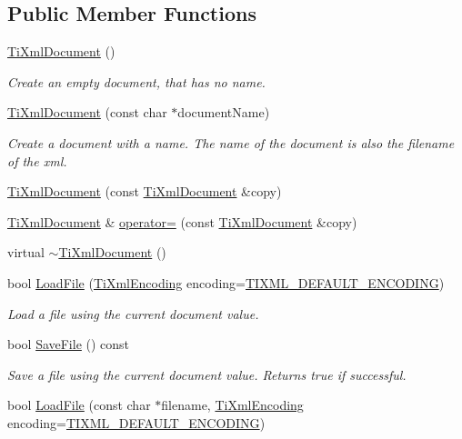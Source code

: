 \subsection*{Public Member Functions}
\begin{DoxyCompactItemize}
\item 
\hyperlink{class_ti_xml_document_a9f5e84335708fde98400230f9f12659c}{TiXmlDocument} ()
\begin{DoxyCompactList}\small\item\em Create an empty document, that has no name. \end{DoxyCompactList}\item 
\hyperlink{class_ti_xml_document_ae4508b452d0c3061db085f3db27b8396}{TiXmlDocument} (const char $\ast$documentName)
\begin{DoxyCompactList}\small\item\em Create a document with a name. The name of the document is also the filename of the xml. \end{DoxyCompactList}\item 
\hyperlink{class_ti_xml_document_a323a7486e7da6099cdc19a5ff7e74b07}{TiXmlDocument} (const \hyperlink{class_ti_xml_document}{TiXmlDocument} \&copy)
\item 
\hyperlink{class_ti_xml_document}{TiXmlDocument} \& \hyperlink{class_ti_xml_document_aa56fd4dbe8917d2033d865909e2d737e}{operator=} (const \hyperlink{class_ti_xml_document}{TiXmlDocument} \&copy)
\item 
virtual \hyperlink{class_ti_xml_document_a1b8a035c2c2aab38e4387246a0b712c5}{$\sim$TiXmlDocument} ()
\item 
bool \hyperlink{class_ti_xml_document_a4c852a889c02cf251117fd1d9fe1845f}{LoadFile} (\hyperlink{tinyxml_8h_a88d51847a13ee0f4b4d320d03d2c4d96}{TiXmlEncoding} encoding=\hyperlink{tinyxml_8h_ad5b8b092878e9010d6400cb6c13d4879}{TIXML\_\-DEFAULT\_\-ENCODING})
\begin{DoxyCompactList}\small\item\em Load a file using the current document value. \end{DoxyCompactList}\item 
bool \hyperlink{class_ti_xml_document_a21c0aeb0d0a720169ad4ac89523ebe93}{SaveFile} () const 
\begin{DoxyCompactList}\small\item\em Save a file using the current document value. Returns true if successful. \end{DoxyCompactList}\item 
bool \hyperlink{class_ti_xml_document_a879cdf5e981b8b2d2ef82f2546dd28fb}{LoadFile} (const char $\ast$filename, \hyperlink{tinyxml_8h_a88d51847a13ee0f4b4d320d03d2c4d96}{TiXmlEncoding} encoding=\hyperlink{tinyxml_8h_ad5b8b092878e9010d6400cb6c13d4879}{TIXML\_\-DEFAULT\_\-ENCODING})

\end{DoxyCompactItemize}
